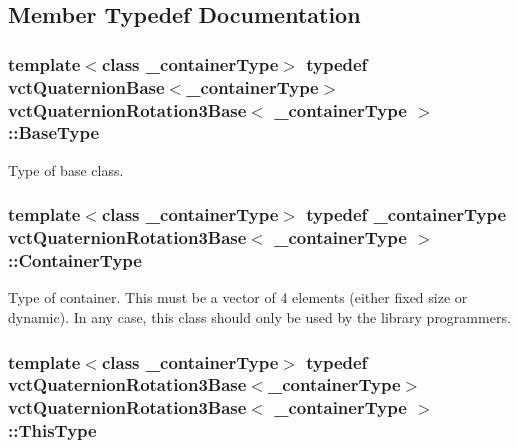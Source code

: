 \subsection{Member Typedef Documentation}
\hypertarget{classvct_quaternion_rotation3_base_aec53a8354bebb034598fe2b02ffc8217}{
\subsubsection[{Base\-Type}]{\setlength{\rightskip}{0pt plus 5cm}template$<$class \-\_\-container\-Type$>$ typedef {\bf vct\-Quaternion\-Base}$<$\-\_\-container\-Type$>$ {\bf vct\-Quaternion\-Rotation3\-Base}$<$ \-\_\-container\-Type $>$\-::{\bf Base\-Type}}}\label{classvct_quaternion_rotation3_base_aec53a8354bebb034598fe2b02ffc8217}
Type of base class. \hypertarget{classvct_quaternion_rotation3_base_a41c3b08279a5560f43351c14666c9c6a}{
\subsubsection[{Container\-Type}]{\setlength{\rightskip}{0pt plus 5cm}template$<$class \-\_\-container\-Type$>$ typedef \-\_\-container\-Type {\bf vct\-Quaternion\-Rotation3\-Base}$<$ \-\_\-container\-Type $>$\-::{\bf Container\-Type}}}\label{classvct_quaternion_rotation3_base_a41c3b08279a5560f43351c14666c9c6a}
Type of container. This must be a vector of 4 elements (either fixed size or dynamic). In any case, this class should only be used by the library programmers. \hypertarget{classvct_quaternion_rotation3_base_aff1feb6ba01e2cbc6f455a140992e728}{
\subsubsection[{This\-Type}]{\setlength{\rightskip}{0pt plus 5cm}template$<$class \-\_\-container\-Type$>$ typedef {\bf vct\-Quaternion\-Rotation3\-Base}$<$\-\_\-container\-Type$>$ {\bf vct\-Quaternion\-Rotation3\-Base}$<$ \-\_\-container\-Type $>$\-::{\bf This\-Type}}}\label{classvct_quaternion_rotation3_base_aff1feb6ba01e2cbc6f455a140992e728}
